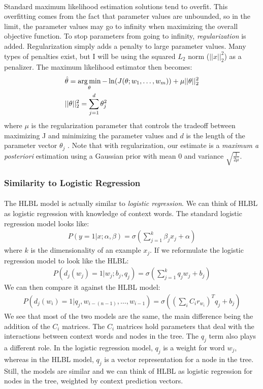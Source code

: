 \paragraph{}
Standard maximum likelihood estimation solutions tend to overfit. This overfitting comes from the fact that parameter values are unbounded, so in the limit, the parameter values may go to infinity when maximizing the overall objective function. To stop parameters from going to infinity, \emph{regularization} is added. Regularization simply adds a penalty to large parameter values. Many types of penalties exist, but I will be using the squared $L_2$ norm ($||x||^2_2$) as a penalizer. The maximum likelihood estimator then becomes:
\begin{align}
&\hat{\theta} = \operatorname*{arg\,min}_\theta -\ln(J(\theta;w_1,\dots, w_m)) +  \mu ||\theta||^2_2
\\
& ||\theta||^2_2 = \sum_{j=1}^d \theta_j^2 \nonumber
\end{align}
where $\mu$ is the regularization parameter that controls the tradeoff between maximizing J and minimizing the parameter values and $d$ is the length of the parameter vector $\theta_j$ \cite{Elkan2013}. Note that with regularization, our estimate is a \emph{maximum a posteriori} estimation using a Gaussian prior with mean 0 and variance $\sqrt{\frac{1}{2\mu}}$.

\subsubsection{Similarity to Logistic Regression}
\paragraph{}
The HLBL model is actually similar to \emph{logistic regression}. We can think of HLBL as logistic regression with knowledge of context words. 
The standard logistic regression model looks like:
\begin{align}
P(y =1 | x; \alpha, \beta) = \sigma \left( \sum_{j=1}^k \beta_j x_j + \alpha \right)
\end{align}
where $k$ is the dimensionality of an example $x_j$.
If we reformulate the logistic regression model to look like the HLBL:
\begin{align}
P( d_j(w_j) = 1 | w_j; b_j, q_j) = \sigma \left( \sum_{j=1}^k q_j w_j + b_j \right)
\end{align}
We can then compare it against the HLBL model:
\begin{align}
P(d_j(w_i) = 1 | q_j, w_{i-(n-1)},\dots, w_{i-1}) =  \sigma( (\sum_i C_i r_{w_i})^T q_{j} +b_{j})
\end{align}
We see that most of the two models are the same, the main difference being the addition of the $C_i$ matrices.  The $C_i$ matrices hold parameters that deal with the interactions between context words and nodes in the tree. The $q_j$ term also plays a different role. In the logistic regression model, $q_j$ is a weight for word $w_j$, whereas in the HLBL model, $q_j$ is a vector representation for a node in the tree. Still, the models are similar and we can think of HLBL as logistic regression for nodes in the tree, weighted by context prediction vectors.


